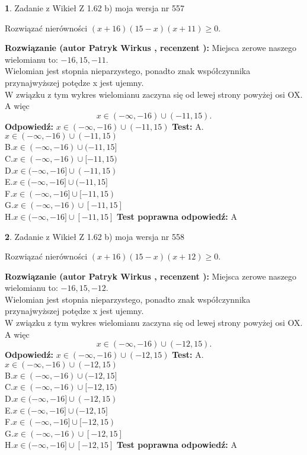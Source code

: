 \documentclass[12pt, a4paper]{article}
\theoremstyle{definition} %
\newtheorem{zad}{}
\newcommand{\zadStart}[1]{\begin{zad}#1\newline}
\newcommand{\zadStop}{\end{zad}}
\newcommand{\rozwStart}[2]{\noindent \textbf{Rozwiązanie (autor #1 , recenzent #2): }\newline}
\newcommand{\rozwStop}{\newline}
\newcommand{\odpStart}{\noindent \textbf{Odpowiedź:}\newline}
\newcommand{\odpStop}{\newline}
\newcommand{\testStart}{\noindent \textbf{Test:}\newline}
\newcommand{\testStop}{\newline}
\newcommand{\kluczStart}{\noindent \textbf{Test poprawna odpowiedź:}\newline}
\newcommand{\kluczStop}{\newline}
\begin{document}
\zadStart{Zadanie z Wikieł Z 1.62 b) moja wersja nr 557}

Rozwiązać nierówności $(x+16)(15-x)(x+11)\ge0$.
\zadStop
\rozwStart{Patryk Wirkus}{}
Miejsca zerowe naszego wielomianu to: $-16, 15, -11$.\\
Wielomian jest stopnia nieparzystego, ponadto znak współczynnika przy\linebreak najwyższej potędze x jest ujemny.\\ W związku z tym wykres wielomianu zaczyna się od lewej strony powyżej osi OX. A więc $$x \in (-\infty,-16) \cup (-11,15).$$
\rozwStop
\odpStart
$x \in (-\infty,-16) \cup (-11,15)$
\odpStop
\testStart
A.$x \in (-\infty,-16) \cup (-11,15)$\\
B.$x \in (-\infty,-16) \cup (-11,15]$\\
C.$x \in (-\infty,-16) \cup [-11,15)$\\
D.$x \in (-\infty,-16] \cup (-11,15)$\\
E.$x \in (-\infty,-16] \cup (-11,15]$\\
F.$x \in (-\infty,-16] \cup [-11,15)$\\
G.$x \in (-\infty,-16) \cup [-11,15]$\\
H.$x \in (-\infty,-16] \cup [-11,15]$
\testStop
\kluczStart
A
\kluczStop



\zadStart{Zadanie z Wikieł Z 1.62 b) moja wersja nr 558}

Rozwiązać nierówności $(x+16)(15-x)(x+12)\ge0$.
\zadStop
\rozwStart{Patryk Wirkus}{}
Miejsca zerowe naszego wielomianu to: $-16, 15, -12$.\\
Wielomian jest stopnia nieparzystego, ponadto znak współczynnika przy\linebreak najwyższej potędze x jest ujemny.\\ W związku z tym wykres wielomianu zaczyna się od lewej strony powyżej osi OX. A więc $$x \in (-\infty,-16) \cup (-12,15).$$
\rozwStop
\odpStart
$x \in (-\infty,-16) \cup (-12,15)$
\odpStop
\testStart
A.$x \in (-\infty,-16) \cup (-12,15)$\\
B.$x \in (-\infty,-16) \cup (-12,15]$\\
C.$x \in (-\infty,-16) \cup [-12,15)$\\
D.$x \in (-\infty,-16] \cup (-12,15)$\\
E.$x \in (-\infty,-16] \cup (-12,15]$\\
F.$x \in (-\infty,-16] \cup [-12,15)$\\
G.$x \in (-\infty,-16) \cup [-12,15]$\\
H.$x \in (-\infty,-16] \cup [-12,15]$
\testStop
\kluczStart
A
\kluczStop
\end{document}
